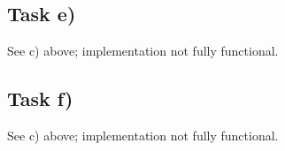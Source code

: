 \documentclass[11pt,a4paper]{article}
\begin{document}
\subsection{Task e)}
See c) above; implementation not fully functional.

\subsection{Task f)}
See c) above; implementation not fully functional.



%
%
%	
%
%
%

%
\end{document}
